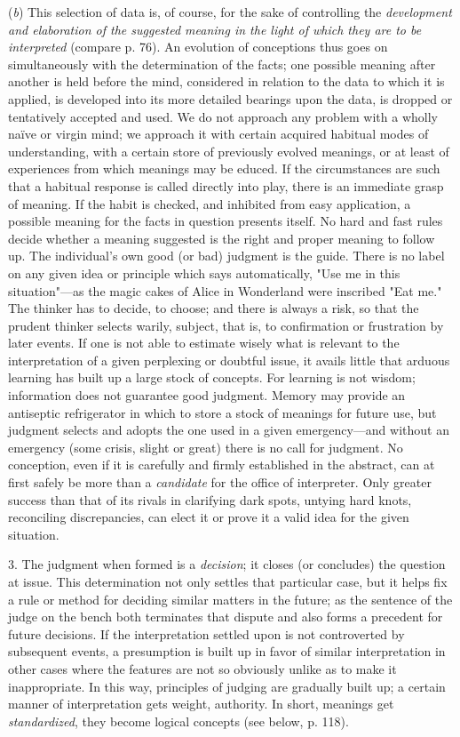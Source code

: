 \documentclass[letterpaper]{book}
\begin{document}
(\emph{b}) This selection of data is, of course, for the sake of
controlling the \emph{development and elaboration of the suggested
meaning in the light of which they are to be interpreted} (compare p.
76). An evolution of conceptions thus goes on simultaneously with the
determination of the facts; one possible meaning after another is held
before the mind, considered in relation to the data to which it is
applied, is developed into its more detailed bearings upon the data, is
dropped or tentatively accepted and used. We do not approach any problem
with a wholly naïve or virgin mind; we approach it with certain acquired
habitual modes of understanding, with a certain store of previously
evolved meanings, or at least of experiences from which meanings may be
educed. If the circumstances are such that a habitual response is called
directly into play, there is an immediate grasp of meaning. If the habit
is checked, and inhibited from easy application, a possible meaning for
the facts in question presents itself. No hard and fast rules decide
whether a meaning suggested is the right and proper meaning to follow
up. The individual's own good (or bad) judgment is the guide. There is
no label on any given idea or principle which says automatically, "Use
me in this situation"---as the magic cakes of Alice in Wonderland were
inscribed "Eat me." The thinker has to decide, to choose; and there is
always a risk, so that the prudent thinker selects warily, subject, that
is, to confirmation or frustration by later events. If one is not able
to estimate wisely what is relevant to the interpretation of a given
perplexing or doubtful issue, it
avails
little that arduous learning has built up a large stock of concepts. For
learning is not wisdom; information does not guarantee good judgment.
Memory may provide an antiseptic refrigerator in which to store a stock
of meanings for future use, but judgment selects and adopts the one used
in a given emergency---and without an emergency (some crisis, slight or
great) there is no call for judgment. No conception, even if it is
carefully and firmly established in the abstract, can at first safely be
more than a \emph{candidate} for the office of interpreter. Only greater
success than that of its rivals in clarifying dark spots, untying hard
knots, reconciling discrepancies, can elect it or prove it a valid idea
for the given situation.


3. The judgment when formed is a \emph{decision}; it closes (or
concludes) the question at issue. This determination not only settles
that particular case, but it helps fix a rule or method for deciding
similar matters in the future; as the sentence of the judge on the bench
both terminates that dispute and also forms a precedent for future
decisions. If the interpretation settled upon is not controverted by
subsequent events, a presumption is built up in favor of similar
interpretation in other cases where the features are not so obviously
unlike as to make it inappropriate. In this way, principles of judging
are gradually built up; a certain manner of interpretation gets weight,
authority. In short, meanings get \emph{standardized}, they become
logical concepts (see below, p. 118).
\end{document}
